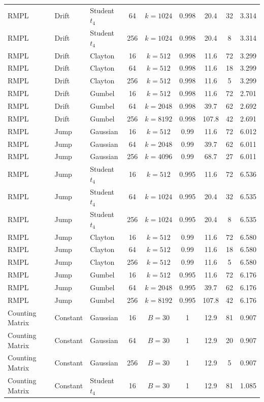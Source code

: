 \begin{longtable}{@{}lllcccccc@{}}
RMPL & Drift & Student $t_4$ & 64 & $k=1024$ & 0.998 & 20.4 & 32 & 3.314 \\
RMPL & Drift & Student $t_4$ & 256 & $k=1024$ & 0.998 & 20.4 & 8 & 3.314 \\
RMPL & Drift & Clayton & 16 & $k=512$ & 0.998 & 11.6 & 72 & 3.299 \\
RMPL & Drift & Clayton & 64 & $k=512$ & 0.998 & 11.6 & 18 & 3.299 \\
RMPL & Drift & Clayton & 256 & $k=512$ & 0.998 & 11.6 & 5 & 3.299 \\
RMPL & Drift & Gumbel & 16 & $k=512$ & 0.998 & 11.6 & 72 & 2.701 \\
RMPL & Drift & Gumbel & 64 & $k=2048$ & 0.998 & 39.7 & 62 & 2.692 \\
RMPL & Drift & Gumbel & 256 & $k=8192$ & 0.998 & 107.8 & 42 & 2.691 \\
\addlinespace
RMPL & Jump & Gaussian & 16 & $k=512$ & 0.99 & 11.6 & 72 & 6.012 \\
RMPL & Jump & Gaussian & 64 & $k=2048$ & 0.99 & 39.7 & 62 & 6.011 \\
RMPL & Jump & Gaussian & 256 & $k=4096$ & 0.99 & 68.7 & 27 & 6.011 \\
RMPL & Jump & Student $t_4$ & 16 & $k=512$ & 0.995 & 11.6 & 72 & 6.536 \\
RMPL & Jump & Student $t_4$ & 64 & $k=1024$ & 0.995 & 20.4 & 32 & 6.535 \\
RMPL & Jump & Student $t_4$ & 256 & $k=1024$ & 0.995 & 20.4 & 8 & 6.535 \\
RMPL & Jump & Clayton & 16 & $k=512$ & 0.99 & 11.6 & 72 & 6.580 \\
RMPL & Jump & Clayton & 64 & $k=512$ & 0.99 & 11.6 & 18 & 6.580 \\
RMPL & Jump & Clayton & 256 & $k=512$ & 0.99 & 11.6 & 5 & 6.580 \\
RMPL & Jump & Gumbel & 16 & $k=512$ & 0.995 & 11.6 & 72 & 6.176 \\
RMPL & Jump & Gumbel & 64 & $k=2048$ & 0.995 & 39.7 & 62 & 6.176 \\
RMPL & Jump & Gumbel & 256 & $k=8192$ & 0.995 & 107.8 & 42 & 6.176 \\
\addlinespace
Counting Matrix & Constant & Gaussian & 16 & $B=30$ & 1 & 12.9 & 81 & 0.907 \\
Counting Matrix & Constant & Gaussian & 64 & $B=30$ & 1 & 12.9 & 20 & 0.907 \\
Counting Matrix & Constant & Gaussian & 256 & $B=30$ & 1 & 12.9 & 5 & 0.907 \\
Counting Matrix & Constant & Student $t_4$ & 16 & $B=30$ & 1 & 12.9 & 81 & 1.085 \\

\end{longtable}
